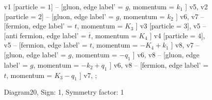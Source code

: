 \documentclass{revtex4}
\begin{document}
\begin{figure}[!htb]
\begin{center}
{    %
v1 [particle = \(1\)] -- [gluon, edge label' = \(g\), momentum = \(k_{1}\) ] v5, 
v2 [particle = \(2\)] -- [gluon, edge label' = \(g\), momentum = \(k_{2}\) ] v6, 
v7 -- [fermion, edge label' = \(t\), momentum = \(K_{3}\) ] v3 [particle = \(3\)], 
v5 -- [anti fermion, edge label' = \(\overline{t}\), momentum = \(K_{4}\) ] v4 [particle = \(4\)], 
v5 -- [fermion, edge label' = \(t\), momentum = \(-K_{4} + k_{1}\) ] v8, 
v7 -- [gluon, edge label' = \(g\), momentum = \(-q_{1}\) ] v6, 
v8 -- [gluon, edge label' = \(g\), momentum = \(-k_{2} + q_{1}\) ] v6, 
v8 -- [fermion, edge label' = \(t\), momentum = \(K_{3} - q_{1}\) ] v7, 
};
\end{center}
\caption{Diagram20, Sign: 1, Symmetry factor: 1}
\end{figure}
\newpage
\end{document}
